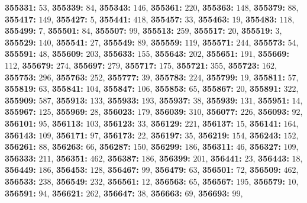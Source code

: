 \textsf{\bfseries 355331:} $53$, \textsf{\bfseries 355339:} $84$, \textsf{\bfseries 355343:} $146$, \textsf{\bfseries 355361:} $220$, \textsf{\bfseries 355363:} $148$, \textsf{\bfseries 355379:} $88$, \textsf{\bfseries 355417:} $149$, \textsf{\bfseries 355427:} $5$, \textsf{\bfseries 355441:} $418$, \textsf{\bfseries 355457:} $33$, \textsf{\bfseries 355463:} $19$, \textsf{\bfseries 355483:} $118$, \textsf{\bfseries 355499:} $7$, \textsf{\bfseries 355501:} $84$, \textsf{\bfseries 355507:} $99$, \textsf{\bfseries 355513:} $259$, \textsf{\bfseries 355517:} $20$, \textsf{\bfseries 355519:} $3$, \textsf{\bfseries 355529:} $140$, \textsf{\bfseries 355541:} $27$, \textsf{\bfseries 355549:} $89$, \textsf{\bfseries 355559:} $119$, \textsf{\bfseries 355571:} $244$, \textsf{\bfseries 355573:} $54$, \textsf{\bfseries 355591:} $48$, \textsf{\bfseries 355609:} $203$, \textsf{\bfseries 355633:} $155$, \textsf{\bfseries 355643:} $202$, \textsf{\bfseries 355651:} $191$, \textsf{\bfseries 355669:} $112$, \textsf{\bfseries 355679:} $274$, \textsf{\bfseries 355697:} $279$, \textsf{\bfseries 355717:} $175$, \textsf{\bfseries 355721:} $355$, \textsf{\bfseries 355723:} $162$, \textsf{\bfseries 355753:} $296$, \textsf{\bfseries 355763:} $252$, \textsf{\bfseries 355777:} $39$, \textsf{\bfseries 355783:} $224$, \textsf{\bfseries 355799:} $19$, \textsf{\bfseries 355811:} $57$, \textsf{\bfseries 355819:} $63$, \textsf{\bfseries 355841:} $104$, \textsf{\bfseries 355847:} $106$, \textsf{\bfseries 355853:} $65$, \textsf{\bfseries 355867:} $20$, \textsf{\bfseries 355891:} $322$, \textsf{\bfseries 355909:} $587$, \textsf{\bfseries 355913:} $133$, \textsf{\bfseries 355933:} $193$, \textsf{\bfseries 355937:} $38$, \textsf{\bfseries 355939:} $131$, \textsf{\bfseries 355951:} $14$, \textsf{\bfseries 355967:} $125$, \textsf{\bfseries 355969:} $28$, \textsf{\bfseries 356023:} $179$, \textsf{\bfseries 356039:} $310$, \textsf{\bfseries 356077:} $226$, \textsf{\bfseries 356093:} $92$, \textsf{\bfseries 356101:} $95$, \textsf{\bfseries 356113:} $103$, \textsf{\bfseries 356123:} $33$, \textsf{\bfseries 356129:} $221$, \textsf{\bfseries 356137:} $15$, \textsf{\bfseries 356141:} $164$, \textsf{\bfseries 356143:} $109$, \textsf{\bfseries 356171:} $97$, \textsf{\bfseries 356173:} $22$, \textsf{\bfseries 356197:} $35$, \textsf{\bfseries 356219:} $154$, \textsf{\bfseries 356243:} $152$, \textsf{\bfseries 356261:} $88$, \textsf{\bfseries 356263:} $66$, \textsf{\bfseries 356287:} $150$, \textsf{\bfseries 356299:} $186$, \textsf{\bfseries 356311:} $46$, \textsf{\bfseries 356327:} $109$, \textsf{\bfseries 356333:} $211$, \textsf{\bfseries 356351:} $462$, \textsf{\bfseries 356387:} $186$, \textsf{\bfseries 356399:} $201$, \textsf{\bfseries 356441:} $23$, \textsf{\bfseries 356443:} $18$, \textsf{\bfseries 356449:} $186$, \textsf{\bfseries 356453:} $128$, \textsf{\bfseries 356467:} $99$, \textsf{\bfseries 356479:} $63$, \textsf{\bfseries 356501:} $72$, \textsf{\bfseries 356509:} $462$, \textsf{\bfseries 356533:} $238$, \textsf{\bfseries 356549:} $232$, \textsf{\bfseries 356561:} $12$, \textsf{\bfseries 356563:} $65$, \textsf{\bfseries 356567:} $195$, \textsf{\bfseries 356579:} $10$, \textsf{\bfseries 356591:} $94$, \textsf{\bfseries 356621:} $262$, \textsf{\bfseries 356647:} $38$, \textsf{\bfseries 356663:} $69$, \textsf{\bfseries 356693:} $99$, 

